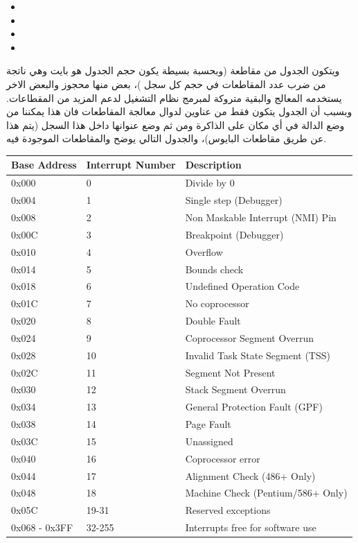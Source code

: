 \documentclass[document.tex]{subfiles}
\begin{document}
\begin{english}
\begin{itemize}
\item {}
\item {}
\item {}
\item {}
\end{itemize}
\end{english}

ويتكون الجدول من  مقاطعة (وبحسبة بسيطة يكون حجم الجدول هو  بايت وهي ناتجة من ضرب عدد المقاطعات في حجم كل سجل )، بعض منها محجوز والبعض الاخر يستخدمه المعالج والبقية متروكة لمبرمج نظام التشغيل لدعم المزيد من المقطاعات. وبسبب أن الجدول يتكون فقط من عناوين لدوال معالجة المقاطعات فان هذا يمكننا من وضع الدالة في أي مكان على الذاكرة ومن ثم وضع عنوانها داخل هذا السجل (يتم هذا عن طريق مقاطعات البايوس)، والجدول التالي يوضح  والمقاطعات الموجودة فيه.

\begin{english}
\begin{tabular}{ | l | l | l |}
\hline  
Base Address & Interrupt Number & Description \\
\hline \hline
0x000	& 0 & Divide by 0 \\
0x004	& 1 & Single step (Debugger) \\
0x008	& 2 & Non Maskable Interrupt (NMI) Pin \\
0x00C	& 3 & Breakpoint (Debugger) \\
0x010	& 4 & Overflow \\
0x014	& 5 & Bounds check \\
0x018	& 6 & Undefined Operation Code \\
0x01C	& 7 & No coprocessor \\
0x020	& 8 & Double Fault \\
0x024	& 9 & Coprocessor Segment Overrun \\
0x028	& 10 & Invalid Task State Segment (TSS) \\
0x02C	& 11 & Segment Not Present \\
0x030	& 12 & Stack Segment Overrun \\
0x034	& 13 & General Protection Fault (GPF) \\
0x038	& 14 & Page Fault \\
0x03C	& 15 & Unassigned \\
0x040	& 16 & Coprocessor error \\
0x044	& 17 & Alignment Check (486+ Only) \\
0x048	& 18 & Machine Check (Pentium/586+ Only) \\
0x05C	& 19-31 & Reserved exceptions \\
0x068 - 0x3FF & 32-255 & Interrupts free for software use \\
 \hline  
\end{tabular}
\end{english}
\end{document}
